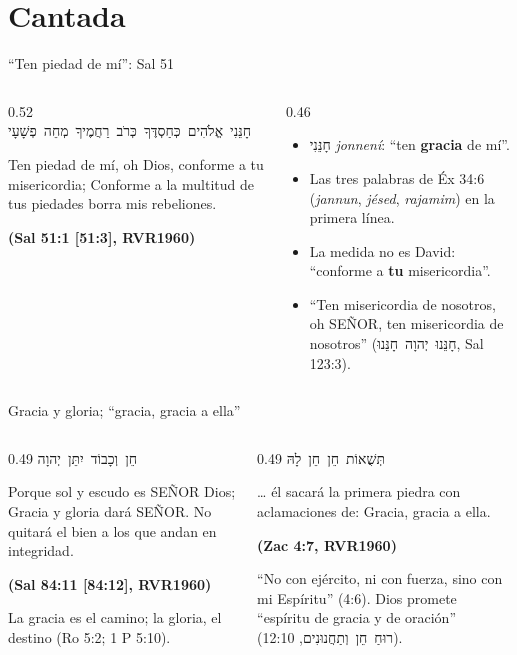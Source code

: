 \documentclass[hyperref={bookmarks=false},aspectratio=169]{beamer}
\newcommand{\heb}[1]{\mbox{\foreignlanguage{hebrew}{#1}}}
\newcommand{\SENOR}{S{\fontsize{0.78em}{1em}\selectfont EÑOR}}
\newcommand{\fuente}[1]{\par\hfill{\upshape\bfseries\footnotesize\textcolor{azul}{#1}}}
\newcommand{\destacar}[1]{\textbf{\textcolor{azul}{#1}}}
\begin{document}
\section{Cantada}

\begin{frame}{``Ten piedad de mí'': Sal 51}
\begin{columns}[c,onlytextwidth]
\begin{column}{0.52\textwidth}
\centering\heb{חָנֵּנִי אֱלֹהִים כְּחַסְדֶּךָ כְּרֹב רַחֲמֶיךָ מְחֵה פְשָׁעָי}
\begin{cita}Ten piedad de mí, oh Dios, conforme a tu misericordia; Conforme a la multitud de tus piedades borra mis rebeliones.\fuente{(Sal 51:1 [51:3], RVR1960)}\end{cita}
\end{column}
\begin{column}{0.46\textwidth}\small\RaggedRight
\begin{itemize}
\item \heb{חָנֵּנִי} \emph{jonnení}: ``ten \destacar{gracia} de mí''.
\item Las tres palabras de Éx 34:6 (\emph{jannun}, \emph{jésed}, \emph{rajamim}) en la primera línea.
\item La medida no es David: ``conforme a \destacar{tu} misericordia''.
\item ``Ten misericordia de nosotros, oh \SENOR, ten misericordia de nosotros'' (\heb{חָנֵּנוּ יְהוָה חָנֵּנוּ}, Sal 123:3).
\end{itemize}
\end{column}
\end{columns}
\end{frame}

\begin{frame}{Gracia y gloria; ``gracia, gracia a ella''}
\begin{columns}[t,onlytextwidth]
\begin{column}{0.49\textwidth}
\centering\heb{חֵן וְכָבוֹד יִתֵּן יְהוָה}
\begin{cita}Porque sol y escudo es \SENOR{} Dios; Gracia y gloria dará \SENOR. No quitará el bien a los que andan en integridad.\fuente{(Sal 84:11 [84:12], RVR1960)}\end{cita}
\scriptsize La gracia es el camino; la gloria, el destino (Ro 5:2; 1 P 5:10).
\end{column}
\begin{column}{0.49\textwidth}
\centering\heb{תְּשֻׁאוֹת חֵן חֵן לָהּ}
\begin{cita}\ldots{} él sacará la primera piedra con aclamaciones de: Gracia, gracia a ella.\fuente{(Zac 4:7, RVR1960)}\end{cita}
\scriptsize ``No con ejército, ni con fuerza, sino con mi Espíritu'' (4:6). Dios promete ``espíritu de gracia y de oración'' (\heb{רוּחַ חֵן וְתַחֲנוּנִים}, 12:10).
\end{column}
\end{columns}
\end{frame}
\end{document}
